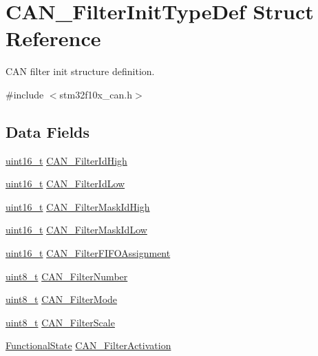 \hypertarget{struct_c_a_n___filter_init_type_def}{\section{C\-A\-N\-\_\-\-Filter\-Init\-Type\-Def Struct Reference}
\label{struct_c_a_n___filter_init_type_def}
}


C\-A\-N filter init structure definition.  




{\ttfamily \#include $<$stm32f10x\-\_\-can.\-h$>$}

\subsection*{Data Fields}
\begin{DoxyCompactItemize}
\item 
\hyperlink{stdint_8h_a273cf69d639a59973b6019625df33e30}{uint16\-\_\-t} \hyperlink{struct_c_a_n___filter_init_type_def_afc109aa8eedced09d296605f2eb871f7}{C\-A\-N\-\_\-\-Filter\-Id\-High}
\item 
\hyperlink{stdint_8h_a273cf69d639a59973b6019625df33e30}{uint16\-\_\-t} \hyperlink{struct_c_a_n___filter_init_type_def_ab8c56b48ac323e8c7a1b535c79a51f87}{C\-A\-N\-\_\-\-Filter\-Id\-Low}
\item 
\hyperlink{stdint_8h_a273cf69d639a59973b6019625df33e30}{uint16\-\_\-t} \hyperlink{struct_c_a_n___filter_init_type_def_a6f34539615e6484f266b46aa8f362a91}{C\-A\-N\-\_\-\-Filter\-Mask\-Id\-High}
\item 
\hyperlink{stdint_8h_a273cf69d639a59973b6019625df33e30}{uint16\-\_\-t} \hyperlink{struct_c_a_n___filter_init_type_def_a0f052daf04b0a481ecfa5c2cc8058089}{C\-A\-N\-\_\-\-Filter\-Mask\-Id\-Low}
\item 
\hyperlink{stdint_8h_a273cf69d639a59973b6019625df33e30}{uint16\-\_\-t} \hyperlink{struct_c_a_n___filter_init_type_def_a01ba491f12097adcc9f0a3d627628d55}{C\-A\-N\-\_\-\-Filter\-F\-I\-F\-O\-Assignment}
\item 
\hyperlink{stdint_8h_aba7bc1797add20fe3efdf37ced1182c5}{uint8\-\_\-t} \hyperlink{struct_c_a_n___filter_init_type_def_af94466e1138c2b4fe6a67cf556981193}{C\-A\-N\-\_\-\-Filter\-Number}
\item 
\hyperlink{stdint_8h_aba7bc1797add20fe3efdf37ced1182c5}{uint8\-\_\-t} \hyperlink{struct_c_a_n___filter_init_type_def_a7cfb23c48aad13a058c2619dbc062d8a}{C\-A\-N\-\_\-\-Filter\-Mode}
\item 
\hyperlink{stdint_8h_aba7bc1797add20fe3efdf37ced1182c5}{uint8\-\_\-t} \hyperlink{struct_c_a_n___filter_init_type_def_a9d52661aca538dbfcafdda6f16dddc82}{C\-A\-N\-\_\-\-Filter\-Scale}
\item 
\hyperlink{group___exported__types_gac9a7e9a35d2513ec15c3b537aaa4fba1}{Functional\-State} \hyperlink{struct_c_a_n___filter_init_type_def_a0225afda33b565f358ca75bdaa780074}{C\-A\-N\-\_\-\-Filter\-Activation}
\end{DoxyCompactItemize}


